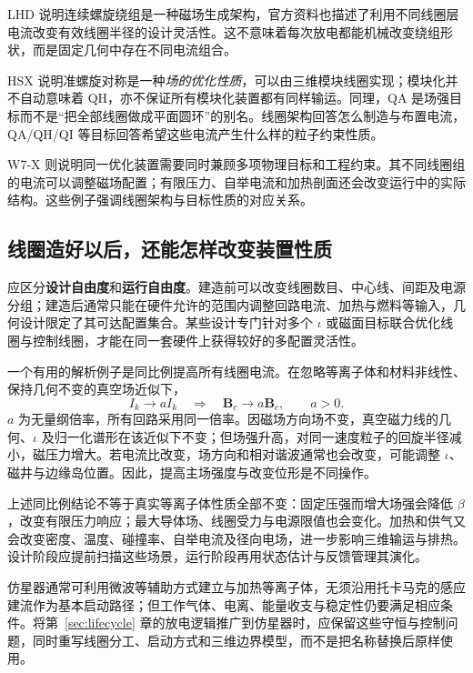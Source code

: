 \documentclass[12pt,fontset=none]{ctexart}
\numberwithin{equation}{section}
\numberwithin{table}{section}
\numberwithin{figure}{section}
\begin{document}
LHD 说明连续螺旋绕组是一种磁场生成架构，官方资料也描述了利用不同线圈层电流改变有效线圈半径的设计灵活性\cite{Slhd,Slhdvariation}。这不意味着每次放电都能机械改变绕组形状，而是固定几何中存在不同电流组合。

HSX 说明准螺旋对称是一种\emph{场的优化性质}，可以由三维模块线圈实现；模块化并不自动意味着 QH，亦不保证所有模块化装置都有同样输运\cite{Shsx}。同理，QA 是场强目标而不是``把全部线圈做成平面圆环''的别名。线圈架构回答怎么制造与布置电流，QA/QH/QI 等目标回答希望这些电流产生什么样的粒子约束性质。

W7-X 则说明同一优化装置需要同时兼顾多项物理目标和工程约束。其不同线圈组的电流可以调整磁场配置；有限压力、自举电流和加热剖面还会改变运行中的实际结构\cite{Sw7x,Sw7xpower}。这些例子强调线圈架构与目标性质的对应关系。

\subsection{线圈造好以后，还能怎样改变装置性质}\label{sec:stellarator-operation}

应区分\textbf{设计自由度}和\textbf{运行自由度}。建造前可以改变线圈数目、中心线、间距及电源分组；建造后通常只能在硬件允许的范围内调整回路电流、加热与燃料等输入，几何设计限定了其可达配置集合。某些设计专门针对多个 $\iota$ 或磁面目标联合优化线圈与控制线圈，才能在同一套硬件上获得较好的多配置灵活性\cite{Smulticonfig}。

一个有用的解析例子是同比例提高所有线圈电流。在忽略等离子体和材料非线性、保持几何不变的真空场近似下，
\begin{equation}\label{eq:stellarator-current-scaling}
 I_k\longrightarrow aI_k\quad\Rightarrow\quad
 \bm B_c\longrightarrow a\bm B_c,\qquad a>0.
\end{equation}
$a$ 为无量纲倍率，所有回路采用同一倍率。因磁场方向场不变，真空磁力线的几何、$\iota$ 及归一化谱形在该近似下不变；但场强升高，对同一速度粒子的回旋半径减小，磁压力增大。若电流比改变，场方向和相对谐波通常也会改变，可能调整 $\iota$、磁井与边缘岛位置。因此，提高主场强度与改变位形是不同操作。

上述同比例结论不等于真实等离子体性质全部不变：固定压强而增大场强会降低 $\beta$，改变有限压力响应；最大导体场、线圈受力与电源限值也会变化。加热和供气又会改变密度、温度、碰撞率、自举电流及径向电场，进一步影响三维输运与排热。设计阶段应提前扫描这些场景，运行阶段再用状态估计与反馈管理其演化。

仿星器通常可利用微波等辅助方式建立与加热等离子体，无须沿用托卡马克的感应建流作为基本启动路径；但工作气体、电离、能量收支与稳定性仍要满足相应条件。将第~\ref{sec:lifecycle} 章的放电逻辑推广到仿星器时，应保留这些守恒与控制问题，同时重写线圈分工、启动方式和三维边界模型，而不是把名称替换后原样使用。
\end{document}
